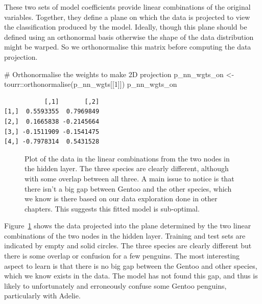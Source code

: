 \documentclass[
  letterpaper,
]{krantz}
\newenvironment{Shaded}{\begin{snugshade}}{\end{snugshade}}
\newcommand{\CommentTok}[1]{\textcolor[rgb]{0.37,0.37,0.37}{#1}}
\newcommand{\DecValTok}[1]{\textcolor[rgb]{0.68,0.00,0.00}{#1}}
\newcommand{\FunctionTok}[1]{\textcolor[rgb]{0.28,0.35,0.67}{#1}}
\newcommand{\NormalTok}[1]{\textcolor[rgb]{0.00,0.23,0.31}{#1}}
\newcommand{\OtherTok}[1]{\textcolor[rgb]{0.00,0.23,0.31}{#1}}
\newcommand{\SpecialCharTok}[1]{\textcolor[rgb]{0.37,0.37,0.37}{#1}}
\begin{document}
These two sets of model coefficients provide linear combinations of the
original variables. Together, they define a plane on which the data is
projected to view the classification produced by the model. Ideally,
though this plane should be defined using an orthonormal basis otherwise
the shape of the data distribution might be warped. So we orthonormalise
this matrix before computing the data projection.

\begin{Shaded}
\begin{Highlighting}[]
\CommentTok{\# Orthonormalise the weights to make 2D projection}
\NormalTok{p\_nn\_wgts\_on }\OtherTok{\textless{}{-}}\NormalTok{ tourr}\SpecialCharTok{::}\FunctionTok{orthonormalise}\NormalTok{(p\_nn\_wgts[[}\DecValTok{1}\NormalTok{]])}
\NormalTok{p\_nn\_wgts\_on}
\end{Highlighting}
\end{Shaded}

\begin{verbatim}
           [,1]       [,2]
[1,]  0.5593355  0.7969849
[2,]  0.1665838 -0.2145664
[3,] -0.1511909 -0.1541475
[4,] -0.7978314  0.5431528
\end{verbatim}

\begin{figure}


\caption{\label{fig-hidden-layer}Plot of the data in the linear
combinations from the two nodes in the hidden layer. The three species
are clearly different, although with some overlap between all three. A
main issue to notice is that there isn't a big gap between Gentoo and
the other species, which we know is there based on our data exploration
done in other chapters. This suggests this fitted model is sub-optimal.}

\end{figure}%

Figure~\ref{fig-hidden-layer} shows the data projected into the plane
determined by the two linear combinations of the two nodes in the hidden
layer. Training and test sets are indicated by empty and solid circles.
The three species are clearly different but there is some overlap or
confusion for a few penguins. The most interesting aspect to learn is
that there is no big gap between the Gentoo and other species, which we
know exists in the data. The model has not found this gap, and thus is
likely to unfortunately and erroneously confuse some Gentoo penguins,
particularly with Adelie.
\end{document}
